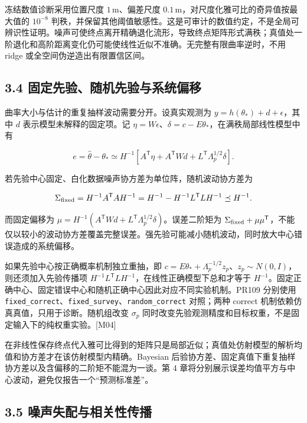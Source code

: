 \documentclass[12pt,a4paper]{article}
\begin{document}
冻结数值诊断采用位置尺度 \(1\,\mathrm m\)、偏差尺度
\(0.1\,\mathrm m\)，对尺度化雅可比的奇异值按最大值的 \(10^{-8}\)
判秩，并保留其他阈值敏感性。这是可审计的数值约定，不是全局可辨识性证明。噪声可使终点离开精确退化流形，导致终点矩阵形式满秩；真值处一阶退化和高阶距离变化仍可能使线性近似不准确。无完整有限曲率逆时，不用
ridge 或全空间伪逆造出有限置信区间。

\subsection{3.4
固定先验、随机先验与系统偏移}\label{ux56faux5b9aux5148ux9a8cux968fux673aux5148ux9a8cux4e0eux7cfbux7edfux504fux79fb}

曲率大小与估计的重复抽样波动需要分开。设真实观测为
\(y=h(\theta_*)+d+\epsilon\)，其中 \(d\) 表示模型未解释的固定项。记
\(\eta=W\epsilon\)、\(\delta=c-E\theta_*\)，在满秩局部线性模型中有

\[e=\widehat\theta-\theta_*
\simeq H^{-1}\left[A^{\mathsf T}\eta+A^{\mathsf T}Wd+L^{\mathsf T}\Lambda_p^{1/2}\delta\right].\]

若先验中心固定、白化数据噪声协方差为单位阵，随机波动协方差为

\[\Sigma_{\rm fixed}=H^{-1}A^{\mathsf T}AH^{-1}
=H^{-1}-H^{-1}L^{\mathsf T}LH^{-1}\preceq H^{-1}.\]

而固定偏移为
\(\mu=H^{-1}(A^{\mathsf T}Wd+L^{\mathsf T}\Lambda_p^{1/2}\delta)\)。误差二阶矩为
\(\Sigma_{\rm fixed}+\mu\mu^{\mathsf T}\)，不能仅以较小的波动协方差覆盖完整误差。强先验可能减小随机波动，同时放大中心错误造成的系统偏移。

如果先验中心按正确概率机制独立重抽，即
\(c=E\theta_*+\Lambda_p^{-1/2}z_p\)、\(z_p\sim N(0,I)\)，则还须加入先验传播项
\(H^{-1}L^{\mathsf T}LH^{-1}\)，在线性正确模型下总和才等于
\(H^{-1}\)。固定正确中心、固定错误中心和随机正确中心因此对应不同实验机制。PR109
分别使用
\texttt{fixed\_correct}、\texttt{fixed\_survey}、\texttt{random\_correct}
对照；两种 correct 机制依赖仿真真值，只用于诊断。随机组改变 \(\sigma_p\)
同时改变先验观测精度和目标权重，不是固定输入下的纯权重实验。{[}M04{]}

在非线性保存终点代入雅可比得到的矩阵只是局部近似；真值处仿射模型的解析均值和协方差才在该仿射模型内精确。Bayesian
后验协方差、固定真值下重复抽样协方差以及含偏移的二阶矩不能混为一谈。第 4
章将分别展示误差均值平方与中心波动，避免仅报告一个``预测标准差''。

\subsection{3.5
噪声失配与相关性传播}\label{ux566aux58f0ux5931ux914dux4e0eux76f8ux5173ux6027ux4f20ux64ad}
\end{document}
